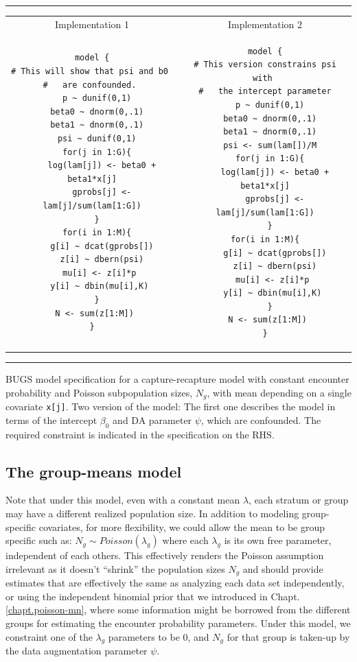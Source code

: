 \begin{panel}[htp]   
\renewcommand{\baselinestretch}{1.0}
\centering
\rule[0.15in]{\textwidth}{.03in}
\begin{tabular}{cc}
Implementation 1 & Implementation 2 \\
\begin{minipage}{2.5in}
{\small
\begin{verbatim}
model {
# This will show that psi and b0 
#   are confounded. 
  p ~ dunif(0,1)
  beta0 ~ dnorm(0,.1)
  beta1 ~ dnorm(0,.1)
  psi ~ dunif(0,1)
  for(j in 1:G){
    log(lam[j]) <- beta0 + beta1*x[j]
    gprobs[j] <- lam[j]/sum(lam[1:G])
  }
  for(i in 1:M){
    g[i] ~ dcat(gprobs[])
    z[i] ~ dbern(psi)
   mu[i] <- z[i]*p
   y[i] ~ dbin(mu[i],K)
  }
  N <- sum(z[1:M]) 
}
\end{verbatim}
}
\end{minipage}
&
\begin{minipage}{2.5in}
{\small
\begin{verbatim}
model {
# This version constrains psi with 
#   the intercept parameter
  p ~ dunif(0,1)
  beta0 ~ dnorm(0,.1)
  beta1 ~ dnorm(0,.1)
  psi <- sum(lam[])/M
  for(j in 1:G){
    log(lam[j]) <- beta0 + beta1*x[j]
    gprobs[j] <- lam[j]/sum(lam[1:G])
  }
  for(i in 1:M){  
    g[i] ~ dcat(gprobs[])
    z[i] ~ dbern(psi)
   mu[i] <- z[i]*p
   y[i] ~ dbin(mu[i],K)
  }
  N <- sum(z[1:M]) 
}
\end{verbatim}
}
\end{minipage}
\end{tabular}
\rule[-0.15in]{\textwidth}{.03in}
\caption{BUGS model specification for a capture-recapture model with
  constant encounter probability and Poisson subpopulation sizes,
  $N_{g}$, with mean depending on a single covariate \mbox{\tt x[j]}. 
Two version of the model: The first one describes the model in terms
of the intercept $\beta_0$ and DA parameter $\psi$, which are
confounded. The required constraint is indicated in the specification
on the RHS. 
}
\label{panel.wbcode}
\end{panel}

\subsection{The group-means model}

Note that under this model, even with a constant mean $\lambda$, each
stratum or group may have a different realized population size. In
addition to modeling group-specific covariates, for
more flexibility, we could allow the mean to be group specific such as:
$N_g \sim Poisson(\lambda_{g})$ where each $\lambda_{g}$ is its own
free parameter, independent of each others.  This effectively renders
the Poisson assumption irrelevant as it doesn't ``shrink'' the
population sizes $N_{g}$ and should provide estimates that are
effectively the same as analyzing each data set independently, or
using the independent binomial prior that we introduced in
Chapt. \ref{chapt.poisson-mn}, where some information might be
borrowed from the different groups for estimating the encounter
probability parameters.
Under this model, we constraint one of the $\lambda_{g}$ parameters
to be 0, and $N_{g}$ for that group is taken-up by the data 
augmentation parameter $\psi$.

